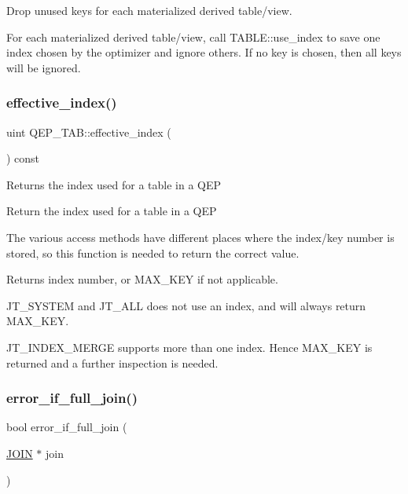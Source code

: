 Drop unused keys for each materialized derived table/view. 

For each materialized derived table/view, call T\+A\+B\+L\+E\+::use\+\_\+index to save one index chosen by the optimizer and ignore others. If no key is chosen, then all keys will be ignored. \mbox{\label{group__Query__Optimizer_gada415e1d087c014e9b8a22b39980bfea}} 
\subsubsection{\texorpdfstring{effective\+\_\+index()}{effective\_index()}}
{\footnotesize\ttfamily uint Q\+E\+P\+\_\+\+T\+A\+B\+::effective\+\_\+index (\begin{DoxyParamCaption}{ }\end{DoxyParamCaption}) const}

\begin{DoxyReturn}{Returns}
the index used for a table in a Q\+EP
\end{DoxyReturn}
Return the index used for a table in a Q\+EP

The various access methods have different places where the index/key number is stored, so this function is needed to return the correct value.

\begin{DoxyReturn}{Returns}
index number, or M\+A\+X\+\_\+\+K\+EY if not applicable.
\end{DoxyReturn}
J\+T\+\_\+\+S\+Y\+S\+T\+EM and J\+T\+\_\+\+A\+LL does not use an index, and will always return M\+A\+X\+\_\+\+K\+EY.

J\+T\+\_\+\+I\+N\+D\+E\+X\+\_\+\+M\+E\+R\+GE supports more than one index. Hence M\+A\+X\+\_\+\+K\+EY is returned and a further inspection is needed. \mbox{\label{group__Query__Optimizer_gaf1351457ee30a4e67786117e50413541}} 
\subsubsection{\texorpdfstring{error\+\_\+if\+\_\+full\+\_\+join()}{error\_if\_full\_join()}}
{\footnotesize\ttfamily bool error\+\_\+if\+\_\+full\+\_\+join (\begin{DoxyParamCaption}\item[{\mbox{\hyperlink{classJOIN}{J\+O\+IN}} $\ast$}]{join }\end{DoxyParamCaption})}


